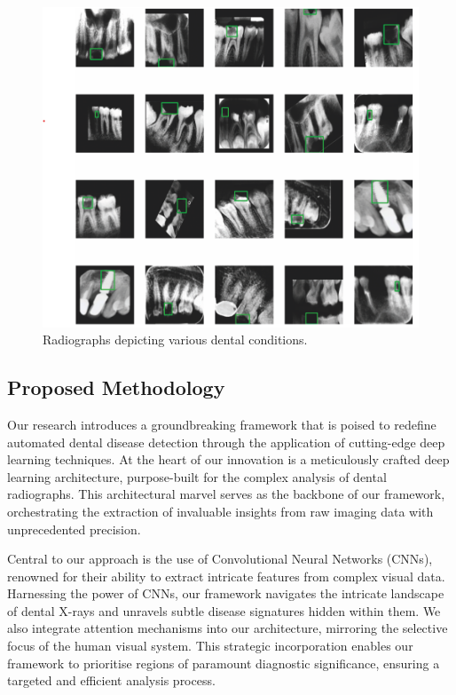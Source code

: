 \documentclass[journal,twoside,web]{ieeecolor}
\begin{document}
\begin{figure}[!t]
    \hspace{-1cm}
    \includegraphics[width=\textwidth]{ss-teeth-full.png}
    \captionsetup{justification=centering, singlelinecheck=off}
    \caption{Radiographs depicting various dental conditions.}
    \label{radiographs1}
\end{figure}


\subsection{Proposed Methodology}

Our research introduces a groundbreaking framework that is poised to redefine automated dental disease detection through the application of cutting-edge deep learning techniques. At the heart of our innovation is a meticulously crafted deep learning architecture, purpose-built for the complex analysis of dental radiographs. This architectural marvel serves as the backbone of our framework, orchestrating the extraction of invaluable insights from raw imaging data with unprecedented precision.

Central to our approach is the use of Convolutional Neural Networks (CNNs), renowned for their ability to extract intricate features from complex visual data. Harnessing the power of CNNs, our framework navigates the intricate landscape of dental X-rays and unravels subtle disease signatures hidden within them. We also integrate attention mechanisms into our architecture, mirroring the selective focus of the human visual system. This strategic incorporation enables our framework to prioritise regions of paramount diagnostic significance, ensuring a targeted and efficient analysis process.
\end{document}
